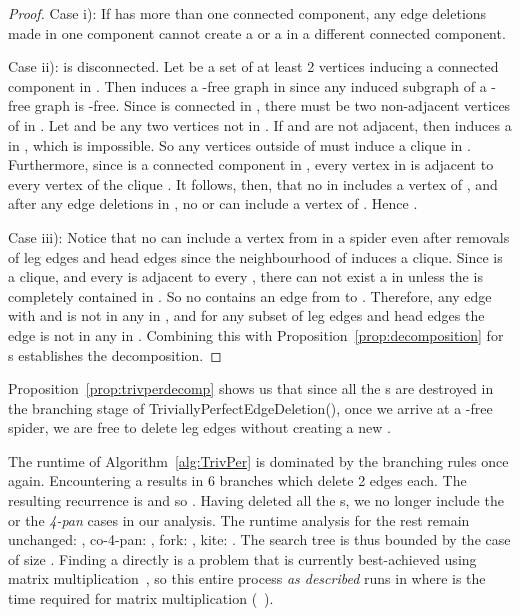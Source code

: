 \documentclass{llncs}
\begin{document}
\begin{proof}

 Case i): If  has more than one connected component, any edge deletions made in one component cannot create a  or a  in a different connected component.

 Case ii):  is disconnected. Let  be a set of at least 2 vertices inducing a connected component in . Then  induces a -free graph in  since any induced subgraph of a -free graph is -free. Since  is connected in , there must be two non-adjacent vertices  of  in . Let  and  be any two vertices not in . If  and  are not adjacent, then  induces a  in , which is impossible. So any vertices outside of  must induce a clique in . Furthermore, since  is a connected component in , every vertex in  is adjacent to every vertex of the clique . It follows, then, that no  in  includes a vertex of , and after any edge deletions in , no  or  can include a vertex of . Hence .

 Case iii): Notice that no  can include a vertex  from  in a spider even after removals of leg edges and head edges since the neighbourhood of  induces a clique. Since  is a clique, and every  is adjacent to every , there can not exist a  in  unless the  is completely contained in . So no  contains an edge from  to . Therefore, any edge  with  and  is not in any  in , and for any subset of leg edges and head edges  the edge  is not in any  in . Combining this with Proposition~\ref{prop:decomposition} for s establishes the decomposition.
\hfill 

\end{proof}

Proposition~\ref{prop:trivperdecomp} shows us that since all the s are destroyed in the branching stage of {\sc TriviallyPerfectEdgeDeletion()}, once we arrive at a -free spider, we are free to delete leg edges without creating a new .







The runtime of Algorithm~\ref{alg:TrivPer} is dominated by the branching rules once again. Encountering a  results in 6 branches which delete 2 edges each. The resulting recurrence is  and so . Having deleted all the s, we no longer include the  or the \emph{4-pan} cases in our analysis. The runtime analysis for the rest remain unchanged: , co-4-pan: , fork: , kite: . The search tree is thus bounded by the  case of size . Finding a  directly is a problem that is currently best-achieved using matrix multiplication~\cite{KrSp}, so this entire process \emph{as described} runs in  where  is the time required for matrix multiplication (~\cite{CopWin}).
\end{document}
